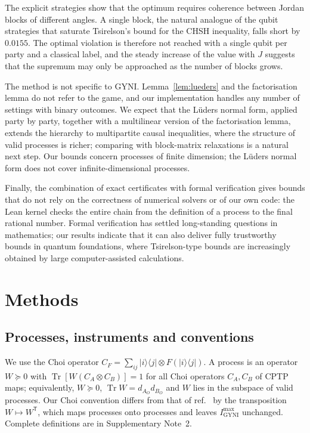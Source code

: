 \documentclass[11pt]{article}
\newcommand{\Tr}{\operatorname{Tr}}
\newcommand{\ket}[1]{\lvert #1\rangle}
\newcommand{\bra}[1]{\langle #1\rvert}
\newcommand{\tp}{\mathsf{T}}
\newcommand{\Imax}{I_{\mathrm{GYNI}}^{\max}}
\begin{document}
The explicit strategies show that the optimum requires coherence between Jordan blocks of different angles. A single block, the natural analogue of the qubit strategies that saturate Tsirelson's bound for the CHSH inequality, falls short by $0.0155$. The optimal violation is therefore not reached with a single qubit per party and a classical label, and the steady increase of the value with $J$ suggests that the supremum may only be approached as the number of blocks grows.

The method is not specific to GYNI. Lemma~\ref{lem:lueders} and the factorisation lemma do not refer to the game, and our implementation handles any number of settings with binary outcomes. We expect that the L\"uders normal form, applied party by party, together with a multilinear version of the factorisation lemma, extends the hierarchy to multipartite causal inequalities\cite{BaumelerWolf2014,Abbott2016}, where the structure of valid processes is richer\cite{Araujo2015,OreshkovGiarmatzi2016}; comparing with block-matrix relaxations\cite{DAlessandro2026} is a natural next step. Our bounds concern processes of finite dimension; the L\"uders normal form does not cover infinite-dimensional processes.

Finally, the combination of exact certificates with formal verification gives bounds that do not rely on the correctness of numerical solvers or of our own code: the Lean kernel checks the entire chain from the definition of a process to the final rational number. Formal verification has settled long-standing questions in mathematics\cite{Hales2017}; our results indicate that it can also deliver fully trustworthy bounds in quantum foundations, where Tsirelson-type bounds are increasingly obtained by large computer-assisted calculations.

\section*{Methods}

\subsection*{Processes, instruments and conventions}
We use the Choi operator $C_F=\sum_{ij}\ket{i}\bra{j}\otimes F(\ket{i}\bra{j})$. A process is an operator $W\succeq0$ with $\Tr[W(C_A\otimes C_B)]=1$ for all Choi operators $C_A,C_B$ of CPTP maps; equivalently, $W\succeq0$, $\Tr W=d_{A_O}d_{B_O}$ and $W$ lies in the subspace of valid processes\cite{Araujo2015}. Our Choi convention differs from that of ref.~ by the transposition $W\mapsto W^\tp$, which maps processes onto processes and leaves $\Imax$ unchanged. Complete definitions are in Supplementary Note~2.
\end{document}
